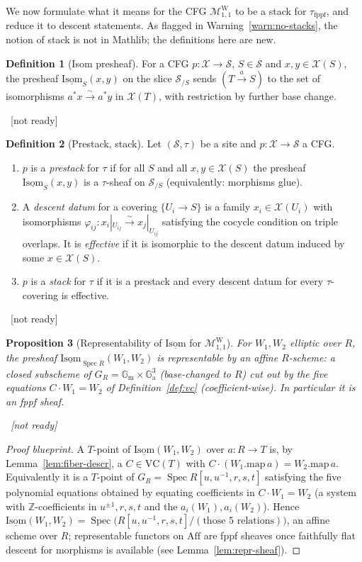 \documentclass[11pt]{article}
\newcommand{\lean}[1]{\par\smallskip\noindent{\footnotesize\texttt{Lean:\ #1}}\par}
\newcommand{\uses}[1]{}
\newcommand{\notready}{{\footnotesize\textcolor{red!60!black}{\ [not ready]}}}
\theoremstyle{definition}
\newtheorem{definition}{Definition}[section]
\theoremstyle{plain}
\newtheorem{proposition}[definition]{Proposition}
\theoremstyle{remark}
\newcommand{\Aff}{\mathrm{Aff}}
\newcommand{\Spec}{\operatorname{Spec}}
\newcommand{\MW}{\mathcal{M}^{\mathrm{W}}_{1,1}}
\newcommand{\VC}{\mathrm{VC}}
\newcommand{\Isom}{\underline{\mathrm{Isom}}}
\newcommand{\Gm}{\mathbb{G}_{\mathrm m}}
\newcommand{\Ga}{\mathbb{G}_{\mathrm a}}
\newcommand{\map}{\mathrm{map}}
\begin{document}
We now formulate what it means for the CFG $\MW$ to be a stack for
$\tau_{\mathrm{fppf}}$, and reduce it to descent statements.  As flagged in
Warning~\ref{warn:no-stacks}, the notion of stack is not in Mathlib; the
definitions here are new.

\begin{definition}[Isom presheaf]\label{def:isompre}
For a CFG $p:\mathcal X\to\mathcal S$, $S\in\mathcal S$ and $x,y\in\mathcal X(S)$,
the presheaf $\Isom_S(x,y)$ on the slice $\mathcal S_{/S}$ sends
$(T\xrightarrow{a}S)$ to the set of isomorphisms $a^*x\xrightarrow{\sim}a^*y$ in
$\mathcal X(T)$, with restriction by further base change.
\lean{}\notready
\uses{def:cfg}
\end{definition}

\begin{definition}[Prestack, stack]\label{def:stack}
Let $(\mathcal S,\tau)$ be a site and $p:\mathcal X\to\mathcal S$ a CFG.
\begin{enumerate}[label=(\alph*)]
\item $p$ is a \emph{prestack} for $\tau$ if for all $S$ and all
$x,y\in\mathcal X(S)$ the presheaf $\Isom_S(x,y)$ is a $\tau$-sheaf on
$\mathcal S_{/S}$ (equivalently: morphisms glue).
\item A \emph{descent datum} for a covering $\{U_i\to S\}$ is a family
$x_i\in\mathcal X(U_i)$ with isomorphisms
$\varphi_{ij}:x_i|_{U_{ij}}\xrightarrow{\sim}x_j|_{U_{ij}}$ satisfying the cocycle
condition on triple overlaps.  It is \emph{effective} if it is isomorphic to the
descent datum induced by some $x\in\mathcal X(S)$.
\item $p$ is a \emph{stack} for $\tau$ if it is a prestack and every descent
datum for every $\tau$-covering is effective.
\end{enumerate}
\lean{}\notready
\uses{def:isompre,def:site}
\end{definition}

\begin{proposition}[Representability of $\Isom$ for $\MW$]\label{prop:isom-rep}
For $W_1,W_2$ elliptic over $R$, the presheaf $\Isom_{\Spec R}(W_1,W_2)$ is
representable by an affine $R$-scheme: a closed subscheme of
$G_R=\Gm\times\Ga^3$ (base-changed to $R$) cut out by the five equations
$C\cdot W_1=W_2$ of Definition~\ref{def:vc} (coefficient-wise).  In particular it
is an fppf sheaf.
\lean{}\notready
\uses{def:isompre,def:vc,def:MW}
\end{proposition}
\begin{proof}[Proof blueprint]
A $T$-point of $\Isom(W_1,W_2)$ over $a:R\to T$ is, by
Lemma~\ref{lem:fiber-descr}, a $C\in\VC(T)$ with
$C\cdot(W_1.\map\,a)=W_2.\map\,a$.  Equivalently it is a $T$-point of
$G_R=\Spec R[u,u^{-1},r,s,t]$ satisfying the five polynomial equations obtained by
equating coefficients in $C\cdot W_1=W_2$ (a system with $\mathbb Z$-coefficients
in $u^{\pm1},r,s,t$ and the $a_i(W_1),a_i(W_2)$).  Hence
$\Isom(W_1,W_2)=\Spec\bigl(R[u,u^{-1},r,s,t]/(\text{those }5\text{ relations})
\bigr)$, an affine scheme over $R$; representable functors on $\Aff$ are fppf
sheaves once faithfully flat descent for morphisms is available (see
Lemma~\ref{lem:repr-sheaf}).
\end{proof}
\end{document}
